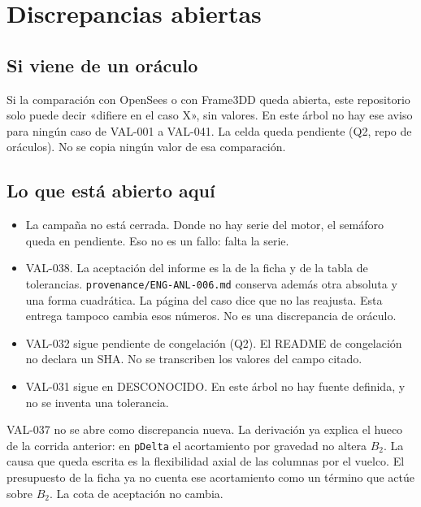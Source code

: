 \chapter{Discrepancias abiertas}
\section{Si viene de un oráculo}
Si la comparación con OpenSees o con Frame3DD queda abierta, este repositorio solo puede decir «difiere en el caso X», sin valores. En este árbol no hay ese aviso para ningún caso de VAL-001 a VAL-041. La celda queda pendiente (Q2, repo de oráculos). No se copia ningún valor de esa comparación.

\section{Lo que está abierto aquí}
\begin{itemize}
\item La campaña no está cerrada. Donde no hay serie del motor, el semáforo queda en pendiente. Eso no es un fallo: falta la serie.
\item VAL-038. La aceptación del informe es la de la ficha y de la tabla de tolerancias. \texttt{provenance/ENG-ANL-006.md} conserva además otra absoluta y una forma cuadrática. La página del caso dice que no las reajusta. Esta entrega tampoco cambia esos números. No es una discrepancia de oráculo.
\item VAL-032 sigue pendiente de congelación (Q2). El README de congelación no declara un SHA. No se transcriben los valores del campo citado.
\item VAL-031 sigue en DESCONOCIDO. En este árbol no hay fuente definida, y no se inventa una tolerancia.
\end{itemize}
VAL-037 no se abre como discrepancia nueva. La derivación ya explica el hueco de la corrida anterior: en \texttt{pDelta} el acortamiento por gravedad no altera \(B_2\). La causa que queda escrita es la flexibilidad axial de las columnas por el vuelco. El presupuesto de la ficha ya no cuenta ese acortamiento como un término que actúe sobre \(B_2\). La cota de aceptación no cambia.
